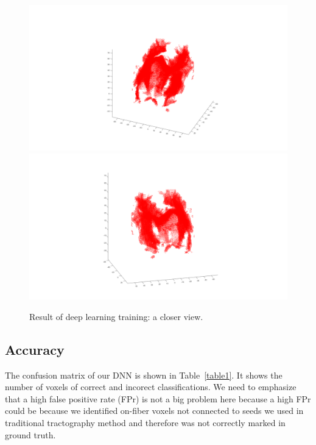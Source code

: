 \documentclass[10pt,twocolumn,letterpaper]{article}
\begin{document}
	\begin{figure}[t]
		\begin{center}
			\includegraphics[width=1\linewidth]{img/2.png}
			\includegraphics[width=1\linewidth]{img/3.png}
		\end{center}
		\caption{Result of deep learning training: a closer view.}
		\label{fig:result2}
	\end{figure}
	
	
	
	\subsection{Accuracy}
	The confusion matrix of our DNN is shown in Table~\ref{table1}. It shows the number of voxels of correct and incorect classifications. We need to emphasize that a high false positive rate (FPr) is not a big problem here because a high FPr could be because we identified on-fiber voxels not connected to seeds we used in traditional tractography method and therefore was not correctly marked in ground truth.
	
\end{document}
